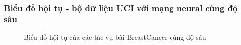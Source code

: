 \subsubsection{Biểu đồ hội tụ - bộ dữ liệu UCI với mạng neural cùng độ sâu}

\begin{figure}[h!]
    \centering
    \caption{Biểu đồ hội tụ của các tác vụ bài BreastCancer cùng độ sâu}
    \label{fig:br_mtl}
\end{figure}

